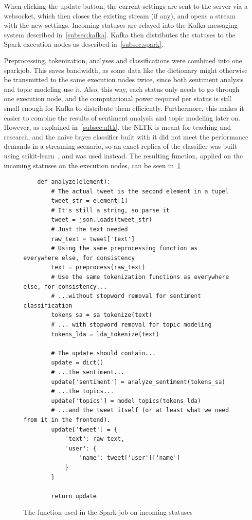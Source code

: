 When clicking the update-button, the current settings are sent to the server via a websocket,
which then closes the existing stream (if any), and opens a stream with the new settings.
Incoming statuses are relayed into the Kafka messaging system described in~\cref{subsec:kafka}.
Kafka then distributes the statuses to the Spark execution nodes as described in~\cref{subsec:spark}.

Preprocessing, tokenization, analyses and classifications were combined into one sparkjob.
This saves bandwidth, as some data like the dictionary might otherwise be transmitted to the same execution nodes twice,
since both sentiment analysis and topic modeling use it.
Also, this way, each status only needs to go through one execution node,
and the computational power required per status is still small enough for Kafka to distribute them efficiently.
Furthermore, this makes it easier to combine the results of sentiment analysis and topic modeling later on.
However, as explained in~\cref{subsec:nltk}, the NLTK is meant for teaching and research,
and the naive bayes classifier built with it did not meet the performance demands in a streaming scenario,
so an exact replica of the classifier was built using scikit-learn~\cite{scikitDocs}, and was used instead.
The resulting function, applied on the incoming statuses on the execution nodes, can be seen in~\cref{fig:spark_job}

\begin{figure}
    \caption{The function used in the Spark job on incoming statuses}
    \label{fig:spark_job}
    \begin{verbatim}
    def analyze(element):
        # The actual tweet is the second element in a tupel
        tweet_str = element[1]
        # It's still a string, so parse it
        tweet = json.loads(tweet_str)
        # Just the text needed
        raw_text = tweet['text']
        # Using the same preprocessing function as everywhere else, for consistency
        text = preprocess(raw_text)
        # Use the same tokenization functions as everywhere else, for consistency...
        # ...without stopword removal for sentiment classification
        tokens_sa = sa_tokenize(text)
        # ... with stopword removal for topic modeling
        tokens_lda = lda_tokenize(text)

        # The update should contain...
        update = dict()
        # ...the sentiment...
        update['sentiment'] = analyze_sentiment(tokens_sa)
        # ...the topics...
        update['topics'] = model_topics(tokens_lda)
        # ...and the tweet itself (or at least what we need from it in the frontend).
        update['tweet'] = {
            'text': raw_text,
            'user': {
                'name': tweet['user']['name']
            }
        }

        return update
    \end{verbatim}
\end{figure}

